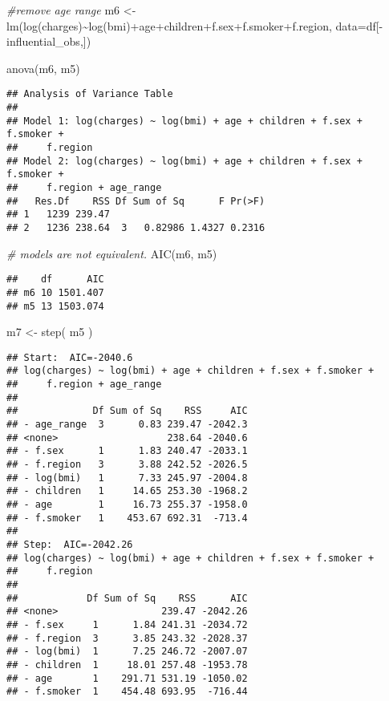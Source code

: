 \documentclass[
]{article}
\newenvironment{Shaded}{\begin{snugshade}}{\end{snugshade}}
\newcommand{\AttributeTok}[1]{\textcolor[rgb]{0.77,0.63,0.00}{#1}}
\newcommand{\CommentTok}[1]{\textcolor[rgb]{0.56,0.35,0.01}{\textit{#1}}}
\newcommand{\FunctionTok}[1]{\textcolor[rgb]{0.00,0.00,0.00}{#1}}
\newcommand{\NormalTok}[1]{#1}
\newcommand{\OtherTok}[1]{\textcolor[rgb]{0.56,0.35,0.01}{#1}}
\newcommand{\SpecialCharTok}[1]{\textcolor[rgb]{0.00,0.00,0.00}{#1}}
\begin{document}
\begin{Shaded}
\begin{Highlighting}[]
\CommentTok{\#remove age range}
\NormalTok{m6 }\OtherTok{\textless{}{-}} \FunctionTok{lm}\NormalTok{(}\FunctionTok{log}\NormalTok{(charges)}\SpecialCharTok{\textasciitilde{}}\FunctionTok{log}\NormalTok{(bmi)}\SpecialCharTok{+}\NormalTok{age}\SpecialCharTok{+}\NormalTok{children}\SpecialCharTok{+}\NormalTok{f.sex}\SpecialCharTok{+}\NormalTok{f.smoker}\SpecialCharTok{+}\NormalTok{f.region, }\AttributeTok{data=}\NormalTok{df[}\SpecialCharTok{{-}}\NormalTok{influential\_obs,])}

\FunctionTok{anova}\NormalTok{(m6, m5)}
\end{Highlighting}
\end{Shaded}

\begin{verbatim}
## Analysis of Variance Table
## 
## Model 1: log(charges) ~ log(bmi) + age + children + f.sex + f.smoker + 
##     f.region
## Model 2: log(charges) ~ log(bmi) + age + children + f.sex + f.smoker + 
##     f.region + age_range
##   Res.Df    RSS Df Sum of Sq      F Pr(>F)
## 1   1239 239.47                           
## 2   1236 238.64  3   0.82986 1.4327 0.2316
\end{verbatim}

\begin{Shaded}
\begin{Highlighting}[]
\CommentTok{\# models are not equivalent.}
\FunctionTok{AIC}\NormalTok{(m6, m5)}
\end{Highlighting}
\end{Shaded}

\begin{verbatim}
##    df      AIC
## m6 10 1501.407
## m5 13 1503.074
\end{verbatim}

\begin{Shaded}
\begin{Highlighting}[]
\NormalTok{m7 }\OtherTok{\textless{}{-}} \FunctionTok{step}\NormalTok{( m5 )}
\end{Highlighting}
\end{Shaded}

\begin{verbatim}
## Start:  AIC=-2040.6
## log(charges) ~ log(bmi) + age + children + f.sex + f.smoker + 
##     f.region + age_range
## 
##             Df Sum of Sq    RSS     AIC
## - age_range  3      0.83 239.47 -2042.3
## <none>                   238.64 -2040.6
## - f.sex      1      1.83 240.47 -2033.1
## - f.region   3      3.88 242.52 -2026.5
## - log(bmi)   1      7.33 245.97 -2004.8
## - children   1     14.65 253.30 -1968.2
## - age        1     16.73 255.37 -1958.0
## - f.smoker   1    453.67 692.31  -713.4
## 
## Step:  AIC=-2042.26
## log(charges) ~ log(bmi) + age + children + f.sex + f.smoker + 
##     f.region
## 
##            Df Sum of Sq    RSS      AIC
## <none>                  239.47 -2042.26
## - f.sex     1      1.84 241.31 -2034.72
## - f.region  3      3.85 243.32 -2028.37
## - log(bmi)  1      7.25 246.72 -2007.07
## - children  1     18.01 257.48 -1953.78
## - age       1    291.71 531.19 -1050.02
## - f.smoker  1    454.48 693.95  -716.44
\end{verbatim}
\end{document}
